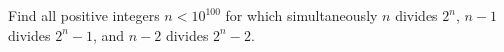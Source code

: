 Find all positive integers $n < 10^{100}$ for which simultaneously $n$ divides $2^n$, $n-1$ divides $2^n-1$,
and $n-2$ divides $2^n - 2$.
